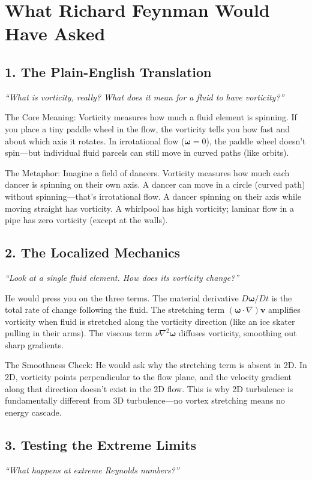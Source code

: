 \documentclass[11pt,openright]{book}
\begin{document}
\section*{What Richard Feynman Would Have Asked}

\subsection*{1. The Plain-English Translation}
\textit{``What is vorticity, really? What does it mean for a fluid to have vorticity?''}

The Core Meaning: Vorticity measures how much a fluid element is spinning. If you place a tiny paddle wheel in the flow, the vorticity tells you how fast and about which axis it rotates. In irrotational flow ($\boldsymbol{\omega} = 0$), the paddle wheel doesn't spin---but individual fluid parcels can still move in curved paths (like orbits).

The Metaphor: Imagine a field of dancers. Vorticity measures how much each dancer is spinning on their own axis. A dancer can move in a circle (curved path) without spinning---that's irrotational flow. A dancer spinning on their axis while moving straight has vorticity. A whirlpool has high vorticity; laminar flow in a pipe has zero vorticity (except at the walls).

\subsection*{2. The Localized Mechanics}
\textit{``Look at a single fluid element. How does its vorticity change?''}

He would press you on the three terms. The material derivative $D\boldsymbol{\omega}/Dt$ is the total rate of change following the fluid. The stretching term $(\boldsymbol{\omega} \cdot \nabla)\mathbf{v}$ amplifies vorticity when fluid is stretched along the vorticity direction (like an ice skater pulling in their arms). The viscous term $\nu \nabla^2 \boldsymbol{\omega}$ diffuses vorticity, smoothing out sharp gradients.

The Smoothness Check: He would ask why the stretching term is absent in 2D. In 2D, vorticity points perpendicular to the flow plane, and the velocity gradient along that direction doesn't exist in the 2D flow. This is why 2D turbulence is fundamentally different from 3D turbulence---no vortex stretching means no energy cascade.

\subsection*{3. Testing the Extreme Limits}
\textit{``What happens at extreme Reynolds numbers?''}
\end{document}
